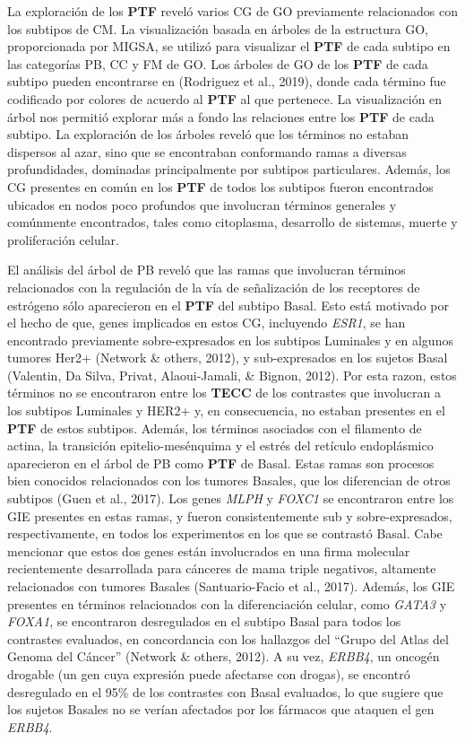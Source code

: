 \documentclass[12pt,twoside]{reedthesis}
\begin{document}
La exploración de los \textbf{PTF} reveló varios CG de GO previamente relacionados con los subtipos de CM. La visualización basada en árboles de la estructura GO, proporcionada por MIGSA, se utilizó para visualizar el \textbf{PTF} de cada subtipo en las categorías PB, CC y FM de GO. Los árboles de GO de los \textbf{PTF} de cada subtipo pueden encontrarse en (Rodriguez et al., 2019), donde cada término fue codificado por colores de acuerdo al \textbf{PTF} al que pertenece. La visualización en árbol nos permitió explorar más a fondo las relaciones entre los \textbf{PTF} de cada subtipo. La exploración de los árboles reveló que los términos no estaban dispersos al azar, sino que se encontraban conformando ramas a diversas profundidades, dominadas principalmente por subtipos particulares. Además, los CG presentes en común en los \textbf{PTF} de todos los subtipos fueron encontrados ubicados en nodos poco profundos que involucran términos generales y comúnmente encontrados, tales como citoplasma, desarrollo de sistemas, muerte y proliferación celular.

\par

El análisis del árbol de PB reveló que las ramas que involucran términos relacionados con la regulación de la vía de señalización de los receptores de estrógeno sólo aparecieron en el \textbf{PTF} del subtipo Basal. Esto está motivado por el hecho de que, genes implicados en estos CG, incluyendo \emph{ESR1}, se han encontrado previamente sobre-expresados en los subtipos Luminales y en algunos tumores Her2+ (Network \& others, 2012), y sub-expresados en los sujetos Basal (Valentin, Da Silva, Privat, Alaoui-Jamali, \& Bignon, 2012). Por esta razon, estos términos no se encontraron entre los \textbf{TECC} de los contrastes que involucran a los subtipos Luminales y HER2+ y, en consecuencia, no estaban presentes en el \textbf{PTF} de estos subtipos. Además, los términos asociados con el filamento de actina, la transición epitelio-mesénquima y el estrés del retículo endoplásmico aparecieron en el árbol de PB como \textbf{PTF} de Basal. Estas ramas son procesos bien conocidos relacionados con los tumores Basales, que los diferencian de otros subtipos (Guen et al., 2017). Los genes \emph{MLPH} y \emph{FOXC1} se encontraron entre los GIE presentes en estas ramas, y fueron consistentemente sub y sobre-expresados, respectivamente, en todos los experimentos en los que se contrastó Basal. Cabe mencionar que estos dos genes están involucrados en una firma molecular recientemente desarrollada para cánceres de mama triple negativos, altamente relacionados con tumores Basales (Santuario-Facio et al., 2017). Además, los GIE presentes en términos relacionados con la diferenciación celular, como \emph{GATA3} y \emph{FOXA1}, se encontraron desregulados en el subtipo Basal para todos los contrastes evaluados, en concordancia con los hallazgos del ``Grupo del Atlas del Genoma del Cáncer'' (Network \& others, 2012). A su vez, \emph{ERBB4}, un oncogén drogable (un gen cuya expresión puede afectarse con drogas), se encontró desregulado en el 95\% de los contrastes con Basal evaluados, lo que sugiere que los sujetos Basales no se verían afectados por los fármacos que ataquen el gen \emph{ERBB4}.
\end{document}
